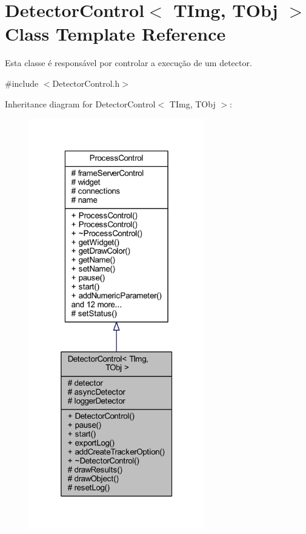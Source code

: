 \hypertarget{class_detector_control}{}\section{Detector\+Control$<$ T\+Img, T\+Obj $>$ Class Template Reference}
\label{class_detector_control}


Esta classe é responsável por controlar a execução de um detector.  




{\ttfamily \#include $<$Detector\+Control.\+h$>$}



Inheritance diagram for Detector\+Control$<$ T\+Img, T\+Obj $>$\+:
\nopagebreak
\begin{figure}[H]
\begin{center}
\leavevmode
\includegraphics[width=217pt]{class_detector_control__inherit__graph}
\end{center}
\end{figure}


